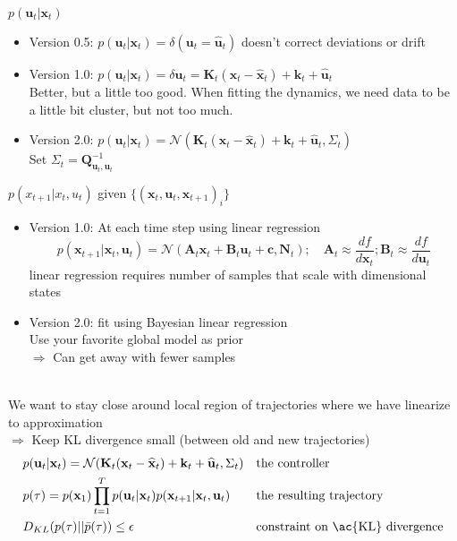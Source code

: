  $p(\textbf{u}_t | \textbf{x}_t)$
\begin{itemize}
	\item Version 0.5: $p(\textbf{u}_t | \textbf{x}_t) = \delta(\textbf{u}_t = \widehat{\textbf{u}}_t)$ doesn't correct deviations or drift
	\item Version 1.0: $p(\textbf{u}_t | \textbf{x}_t) = \delta \textbf{u}_t = \textbf{K}_t (\textbf{x}_t - \widehat{\textbf{x}}_t) + \textbf{k}_t + \widehat{\textbf{u}}_t$\\
	Better, but a little too good. When fitting the dynamics, we need data to be a little bit cluster, but not too much. 
	\item Version 2.0: $p(\textbf{u}_t | \textbf{x}_t) = \mathcal{N}(\textbf{K}_t (\textbf{x}_t - \widehat{\textbf{x}}_t) + \textbf{k}_t + \widehat{\textbf{u}}_t, \Sigma_t)$\\
	Set $\Sigma_t = \textbf{Q}_{\textbf{u}_t, \textbf{u}_t}^{-1}$
\end{itemize}

 $p(x_{t+1} | x_t, u_t)$ given $\{ (\textbf{x}_t, \textbf{u}_t, \textbf{x}_{t+1})_i \}$
\begin{itemize}
	\item Version 1.0: At each time step using linear regression
	\[ p(\textbf{x}_{t+1} | \textbf{x}_t, \textbf{u}_t) = \mathcal{N}(\textbf{A}_t \textbf{x}_t + \textbf{B}_t \textbf{u}_t + \textbf{c}, \textbf{N}_t); \quad \textbf{A}_t \approx \frac{df}{d\textbf{x}_t}; \textbf{B}_t \approx \frac{df}{d\textbf{u}_t} \]
	 linear regression requires number of samples that scale with dimensional states
	\item Version 2.0: fit using Bayesian linear regression\\
	Use your favorite global model as prior\\
	$\Rightarrow$ Can get away with fewer samples
\end{itemize}

\\
We want to stay close around local region of trajectories where we have linearize to approximation\\
$\Rightarrow$ Keep \ac{KL} divergence small (between old and new trajectories) \cite{levine2014learning}
\begin{align}
	&p(\textbf{u}_t | \textbf{x}_t) = \mathcal{N}(\textbf{K}_t (\textbf{x}_t - \widehat{\textbf{x}}_t) + \textbf{k}_t + \widehat{\textbf{u}}_t, \Sigma_t) && \text{the controller}\\
	&p(\tau) = p(\textbf{x}_1) \prod_{t=1}^T p(\textbf{u}_t | \textbf{x}_t) p(\textbf{x}_{t+1} | \textbf{x}_t, \textbf{u}_t) && \text{the resulting trajectory}\\
	& D_{KL}(p(\tau) || \bar{p}(\tau)) \leq \epsilon && \text{constraint on \ac{KL} divergence}
\end{align}

